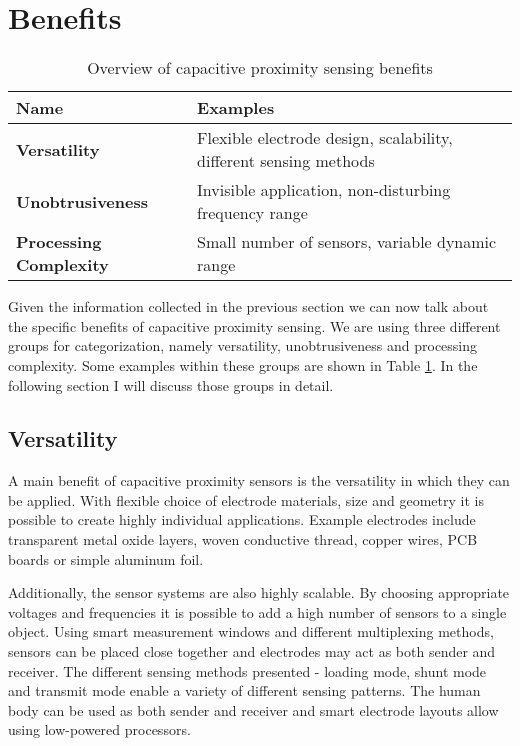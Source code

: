 \section{Benefits}
\begin{table}[htbp]
  \centering
  \caption{Overview of capacitive proximity sensing benefits}
    \begin{tabular}{p{4cm}p{6cm}}
    \toprule
    \textbf{Name} & \textbf{Examples} \\
    \midrule
    \textbf{Versatility} & Flexible electrode design, scalability, different sensing methods \\
    \textbf{Unobtrusiveness} & Invisible application, non-disturbing frequency range \\
    \textbf{Processing Complexity} & Small number of sensors, variable dynamic range \\
    \bottomrule
    \end{tabular}%
  \label{tab:cap_benefits}%
\end{table}%

Given the information collected in the previous section we can now talk about the specific benefits of capacitive proximity sensing. We are using three different groups for categorization, namely versatility, unobtrusiveness and processing complexity. Some examples within these groups are shown in Table \ref{tab:cap_benefits}. In the following section I will discuss those groups in detail.
\subsection{Versatility}
A main benefit of capacitive proximity sensors is the versatility in which they can be applied. With flexible choice of electrode materials, size and geometry it is possible to create highly individual applications. Example electrodes include transparent metal oxide layers, woven conductive thread, copper wires, PCB boards or simple aluminum foil. 

Additionally, the sensor systems are also highly scalable. By choosing appropriate voltages and frequencies it is possible to add a high number of sensors to a single object. Using smart measurement windows and different multiplexing methods, sensors can be placed close together and electrodes may act as both sender and receiver.
The different sensing methods presented - loading mode, shunt mode and transmit mode enable a variety of different sensing patterns. The human body can be used as both sender and receiver and smart electrode layouts allow using low-powered processors. 

